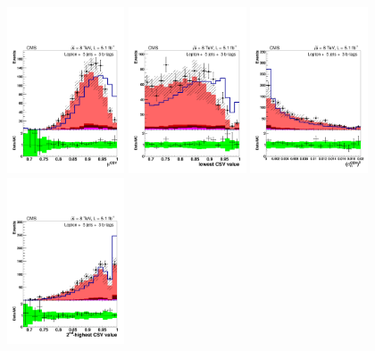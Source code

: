 \begin{figure}[hbtp]
 \begin{center}
   \includegraphics[width=0.31\textwidth]{Figures/Analysis_1_Diagrams/d2MCPlots_avg_btag_disc_btags_cut5_j5_t3_Combined_HtWgt.pdf}
   \includegraphics[width=0.31\textwidth]{Figures/Analysis_1_Diagrams/d2MCPlots_lowest_btag_cut5_j5_t3_Combined_HtWgt.pdf}
   \includegraphics[width=0.31\textwidth]{Figures/Analysis_1_Diagrams/d2MCPlots_dev_from_avg_disc_btags_cut5_j5_t3_Combined_HtWgt.pdf}
   \includegraphics[width=0.31\textwidth]{Figures/Analysis_1_Diagrams/d2MCPlots_second_highest_btag_cut5_j5_t3_Combined_HtWgt.pdf}

\end{center}
\end{figure}
